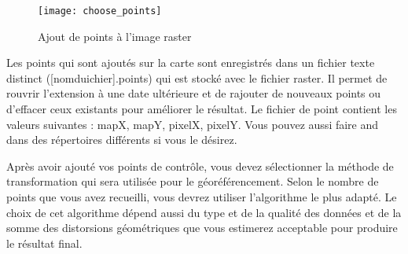 
\begin{figure}[ht]
\begin{center}
  \texttt{[image: choose\_points]}
  \caption{Ajout de points à l'image raster \nixcaption}\label{fig:choose_points}
\end{center}
\end{figure}


Les points qui sont ajoutés sur la carte sont enregistrés dans un fichier texte distinct ([nomduichier].points) qui est stocké avec le fichier raster. Il permet de rouvrir l'extension à une date ultérieure et de rajouter de nouveaux points ou d'effacer ceux existants pour améliorer le résultat. Le fichier de  point contient les valeurs suivantes : mapX, mapY, pixelX, pixelY. Vous pouvez aussi faire  and  dans des répertoires différents si vous le désirez.

\label{georeferencer_transformation}


Après avoir ajouté vos points de contrôle, vous devez sélectionner la méthode de transformation qui sera utilisée pour le géoréférencement. Selon le nombre de points que vous avez recueilli, vous devrez utiliser l'algorithme le plus adapté. Le choix de cet algorithme dépend aussi du type et de la qualité des données et de la somme des distorsions géométriques que vous estimerez acceptable pour produire le résultat final.

